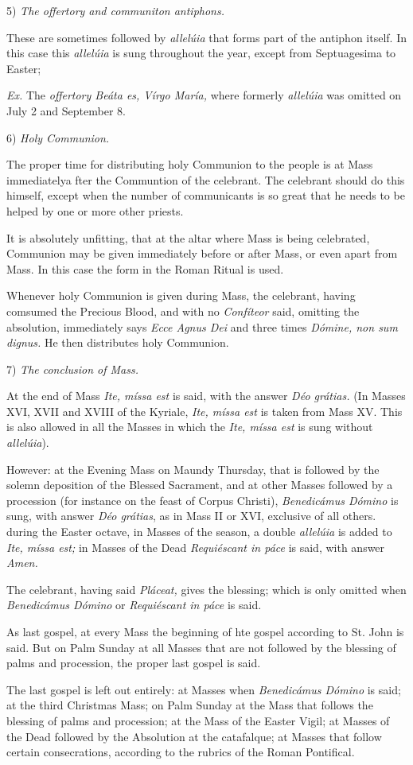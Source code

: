 5) {\it The offertory and communiton antiphons.}

These are sometimes followed by {\it allelúia} that forms part of the antiphon itself. In this case this {\it allelúia} is sung throughout the year, except from Septuagesima to Easter;

{\it Ex.} The {\it offertory Beáta es, Vírgo María,} where formerly {\it allelúia} was omitted on July 2 and September 8.

6) {\it Holy Communion.}

The proper time for distributing holy Communion to the people is at Mass immediatelya fter the Communtion of the celebrant. The celebrant should do this himself, except when the number of communicants is so great that he needs to be helped by one or more other priests.

It is absolutely unfitting, that at the altar where Mass is being celebrated, Communion may be given immediately before or after Mass, or even apart from Mass. In this case the form in the Roman Ritual is used.

Whenever holy Communion is given during Mass, the celebrant, having comsumed the Precious Blood, and with no {\it Confíteor} said, omitting the absolution, immediately says {\it Ecce Agnus Dei} and three times {\it Dómine, non sum dignus.} He then distributes holy Communion.

7) {\it The conclusion of Mass.}

At the end of Mass {\it Ite, míssa est} is said, with the answer {\it Déo grátias.} (In Masses XVI, XVII and XVIII of the Kyriale, {\it Ite, míssa est} is taken from Mass XV. This is also allowed in all the Masses in which the {\it Ite, míssa est} is sung without {\it allelúia}).

However:
at the Evening Mass on Maundy Thursday, that is followed by the solemn deposition of the Blessed Sacrament, and at other Masses followed by a procession (for instance on the feast of Corpus Christi), {\it Benedicámus Dómino} is sung, with answer {\it Déo grátias}, as in Mass II or XVI, exclusive of all others.
during the Easter octave, in Masses of the season, a double {\it allelúia} is added to  {\it Ite, míssa est;}
in Masses of the Dead {\it Requiéscant in páce} is said, with answer {\it Amen.}

The celebrant, having said {\it Pláceat,} gives the blessing; which is only omitted when {\it Benedicámus Dómino} or {\it Requiéscant in páce} is said.

As last gospel, at every Mass the beginning of hte gospel according to St. John is said. But on Palm Sunday at all Masses that are not followed by the blessing of palms and procession, the proper last gospel is said.

The last gospel is left out entirely:
at Masses when {\it Benedicámus Dómino} is said;
at the third Christmas Mass;
on Palm Sunday at the Mass that follows the blessing of palms and procession;
at the Mass of the Easter Vigil;
at Masses of the Dead followed by the Absolution at the catafalque;
at Masses that follow certain consecrations, according to the rubrics of the Roman Pontifical.


